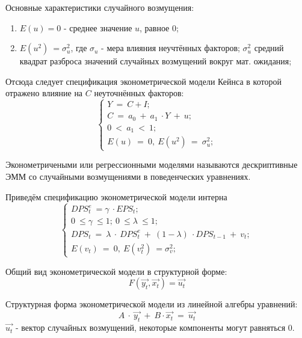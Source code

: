 \documentclass[12pt,a4paper]{article}
\begin{document}
	Основные характеристики случайного возмущения:
\begin{enumerate}
\item $\displaystyle E( u) =0$ - среднее значение $\displaystyle u$, равное 0;
\item $\displaystyle E\left( u^{2}\right) \ =\sigma ^{2}_{u}$, где $\displaystyle \sigma _{u}$ - мера влияния неучтённых факторов; $\displaystyle \sigma ^{2}_{u}$ средний квадрат разброса значений случайных возмущений вокруг мат. ожидания;
\end{enumerate}

	Отсюда следует спецификация эконометрической модели Кейнса в которой отражено влияние на $\displaystyle C$ неуточнённых факторов:
\begin{equation}
\begin{cases}
Y\ =\ C+I;\\
C\ =\ a_{0} \ +\ a_{1} \ \cdot Y\ +\ u;\\
0\ < \ a_{1} \ < \ 1;\\
E( u) \ =\ 0,\ E\left( u^{2}\right) \ =\ \sigma ^{2}_{u};
\end{cases}
\end{equation}

Эконометричеными или регрессионными моделями называются дескриптивные ЭММ со случайными возмущениями в поведенческих уравнениях.

	Приведём спецификацию эконометрической модели интерна
\begin{equation}
\begin{cases}
DPS^{e}_{t} \ =\gamma \ \cdot EPS_{t} ;\\
0\ \leq \gamma \ \leq 1;\ 0\ \leq \lambda \ \leq 1;\\
DPS_{t} \ =\ \lambda \ \cdot \ DPS^{e}_{t} \ +\ ( 1-\lambda ) \ \cdot DPS_{t-1} \ +\ v_{t} ;\\
E( v_{t}) \ =\ 0,\ E\left( v^{2}_{t}\right) \ =\sigma ^{2}_{v} ;\ 
\end{cases}
\end{equation}

Общий вид эконометрической модели в структурной форме:
\begin{equation}
F\left(\overrightarrow{y_{t}} ,\overrightarrow{x_{t}}\right) =\overrightarrow{u_{t}}
\end{equation}

Структурная форма эконометрической модели из линейной алгебры уравнений:
\begin{equation}
A\ \cdotp \ \overrightarrow{y_{t}} \ +\ B\cdotp \overrightarrow{x_{t}} \ =\ \overrightarrow{u_{t}}
\end{equation}
$\displaystyle \overrightarrow{u_{t}}$ - вектор случайных возмущений, некоторые компоненты могут равняться 0.
\end{document}
